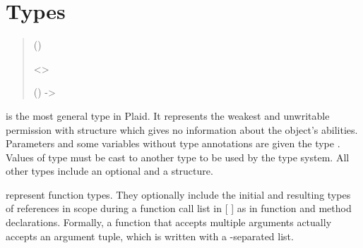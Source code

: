 \section{Types}

\begin{quote}


 {}

 {} 

 {} 

 ()


 {}

 {}

 {}


 {} <>

 {}


 {} 


 {} ()  -> 


 {}

 {} 


{ {} }



\end{quote}

 is the most general type in Plaid.  It represents the weakest
and unwritable permission  with structure 
which gives no information about the object's abilities.  Parameters
and some variables without type annotations are given the
type .  Values of type  must
be cast to another type to be used by the type system.  All other
types include an optional  and a structure.

 represent function types.  They optionally
include the initial and resulting types of references in scope during a
function call list in [ ] as in function and method declarations. 
Formally, a function that accepts multiple arguments actually accepts an
argument tuple, which is written with a \code{*}-separated list.

